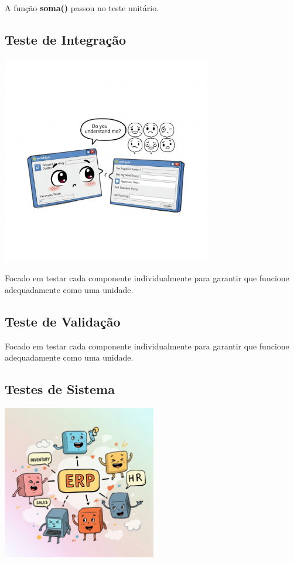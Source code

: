 \documentclass[
]{book}
\begin{document}
A função \textbf{soma()} passou no teste unitário.

\subsection{Teste de Integração}\label{teste-de-integrauxe7uxe3o}

\includegraphics[width=3.60417in,height=\textheight]{images/VerificacaoValidacao/TestesSoftware/teste_integracao.jpeg}

Focado em testar cada componente individualmente para garantir que funcione adequadamente como uma unidade.

\subsection{Teste de Validação}\label{teste-de-validauxe7uxe3o}

Focado em testar cada componente individualmente para garantir que funcione adequadamente como uma unidade.

\subsection{Testes de Sistema}\label{testes-de-sistema}

\includegraphics[width=2.64583in,height=\textheight]{images/VerificacaoValidacao/TestesSoftware/teste_de_sistema.jpeg}
\end{document}
